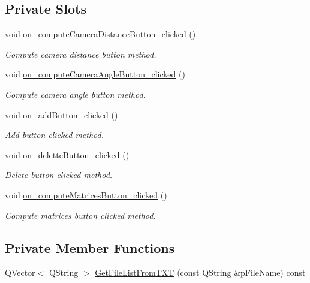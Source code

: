 \subsection*{Private Slots}
\begin{DoxyCompactItemize}
\item 
void \hyperlink{class_dutagaci_dialog_a5123e9a0c94d27945c7ce6f6c7f680b5}{on\+\_\+compute\+Camera\+Distance\+Button\+\_\+clicked} ()
\begin{DoxyCompactList}\small\item\em Compute camera distance button method. \end{DoxyCompactList}\item 
void \hyperlink{class_dutagaci_dialog_a6c7e1eedfc75bfe332e47e31877a07e7}{on\+\_\+compute\+Camera\+Angle\+Button\+\_\+clicked} ()
\begin{DoxyCompactList}\small\item\em Compute camera angle button method. \end{DoxyCompactList}\item 
void \hyperlink{class_dutagaci_dialog_a4fa0455f5f2ea033acc66db4c42b60f8}{on\+\_\+add\+Button\+\_\+clicked} ()
\begin{DoxyCompactList}\small\item\em Add button clicked method. \end{DoxyCompactList}\item 
void \hyperlink{class_dutagaci_dialog_a32f20e660a56aa8e789ce9c97b526bfc}{on\+\_\+delette\+Button\+\_\+clicked} ()
\begin{DoxyCompactList}\small\item\em Delete button clicked method. \end{DoxyCompactList}\item 
void \hyperlink{class_dutagaci_dialog_a87e953653f670bef399d7889bab618cd}{on\+\_\+compute\+Matrices\+Button\+\_\+clicked} ()
\begin{DoxyCompactList}\small\item\em Compute matrices button clicked method. \end{DoxyCompactList}\end{DoxyCompactItemize}
\subsection*{Private Member Functions}
\begin{DoxyCompactItemize}
\item 
Q\+Vector$<$ Q\+String $>$ \hyperlink{class_dutagaci_dialog_a6eace3feddf7a9e1bd39a1d0fa3e869e}{Get\+File\+List\+From\+T\+X\+T} (const Q\+String \&p\+File\+Name) const 
\end{DoxyCompactItemize}
